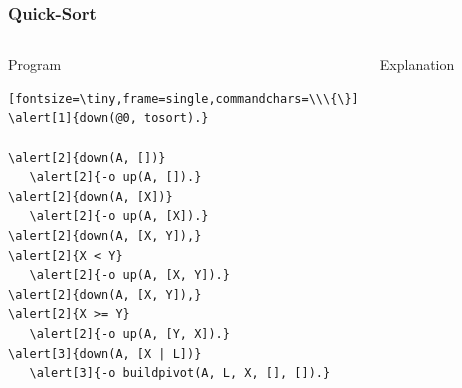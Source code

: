 \documentclass{beamer}
\let\oldalert\alert
\renewcommand{\alert}[2][]{%
  \if\relax\detokenize{#1}\relax%
    \oldalert{#2}%
  \else
    \oldalert<#1>{#2}%
  \fi}
\begin{document}
\begin{frame}[fragile]
  \frametitle{Quick-Sort}
  \begin{columns}[t]
       \begin{block}{Program}
         \begin{verbatim}[fontsize=\tiny,frame=single,commandchars=\\\{\}]
\alert[1]{down(@0, tosort).}

\alert[2]{down(A, [])}
   \alert[2]{-o up(A, []).}
\alert[2]{down(A, [X])}
   \alert[2]{-o up(A, [X]).}
\alert[2]{down(A, [X, Y]),}
\alert[2]{X < Y}
   \alert[2]{-o up(A, [X, Y]).}
\alert[2]{down(A, [X, Y]),}
\alert[2]{X >= Y}
   \alert[2]{-o up(A, [Y, X]).}
\alert[3]{down(A, [X | L])}
   \alert[3]{-o buildpivot(A, L, X, [], []).}
         \end{verbatim}
      \end{block}
      \begin{block}{Explanation}
         {\scriptsize
         \begin{itemize}
         \end{itemize}
         }
      \end{block}
   \end{columns}
\end{frame}
\end{document}

